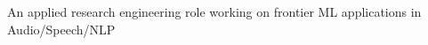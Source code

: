 

\begin{cvskills}

  \cvskill
    {}
     {An applied research engineering role working on frontier ML applications in Audio/Speech/NLP}

\end{cvskills}
